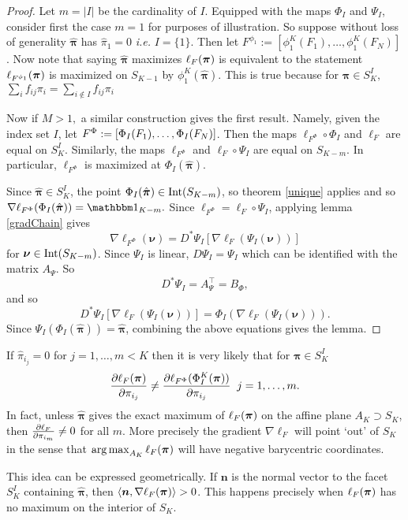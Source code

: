 \begin{proof}
	Let \( m = |I| \) be the cardinality of \( I \).
	Equipped with the maps \( \Phi_I \) and \( \Psi_I \), consider first the case \( m = 1 \)  for purposes of illustration. So suppose without loss of generality \( \hat{\bm \pi} \) has \( \hat{\pi}_1 = 0\) \textit{i.e.} \( I = \{1\} \).  Then let \( F^{\phi_1} := [\phi_1^{K}(F_1),\ldots,\phi_1^{K}(F_N)] \). Now note that saying \( \hat{\bm\pi} \) maximizes \( \elpi F \) is equivalent to the statement \(\elpi{F^{\phi_1}}\) is maximized on \( S_{K-1} \) by \( \phi_1^{K}(\hat{\bm \pi}) \). This is true because for \( \bm\pi\in S_K^I, \) \( \sum_i f_{ij}\pi_i = \sum_{i\notin I} f_{ij}\pi_i\)
		
	Now if \(M>1,\) a similar construction gives the first result. Namely, given the index set \( I \), let \( F^{\Phi} \defined [\Phi_I(F_1),\ldots,\Phi_I(F_N)] \). Then the maps \( \ell_{F^{\Phi}}\circ \Phi_I \) and \(\ell_{F}\) are equal on \( S_K^I \). Similarly, the maps \(\ell_{F^{\Phi}}\) and \(\ell_{F}\circ\Psi_I\) are equal on \( S_{K-m} \).  In particular, \(\ell_{F^{\Phi}}\) is maximized at \(\Phi_I(\hat{\bm \pi})\).
	
	Since \( \hat{\bm \pi}\in S_K^I \), the point \( \Phi_I(\hat{\bm \pi})\in\op{Int}(S_{K-m}) \), so theorem \ref{unique} applies and so \( \nabla \ell_{F^{\Phi}}(\Phi_I(\hat{\bm \pi})) = \mathbbm 1_{K-m}. \)  Since \(\ell_{F^{\Phi}} = \ell_{F}\circ\Psi_I\), applying lemma \ref{gradChain} gives
	\[ \nabla \ell_{F^{\Phi}}(\bm\nu)  = D^{\ast}\Psi_I[\nabla \ell_F(\Psi_I(\bm\nu))]\]
	for \( \bm\nu\in \op{Int}(S_{K-m})\).  Since \( \Psi_I \) is linear, \( D\Psi_I= \Psi_I \) which can be identified with the matrix \( A_{\Psi} \). So 
	\[ D^{\ast}\Psi_I = A_{\Psi}^{\intercal} = B_{\Phi}, \] 
	and so
	\[ D^{\ast}\Psi_I[\nabla \ell_F(\Psi_I(\bm\nu))] = \Phi_I(\nabla \ell_F(\Psi_I(\bm\nu))). \]
	Since \( \Psi_I(\Phi_I(\hat{\bm \pi})) =  \hat{\bm \pi}\), combining the above equations gives the lemma.
\end{proof}

\begin{rk}\label{rk:boundaryGradient}
	If \( \hat{\pi}_{i_j} =0 \) for \( j=1,\ldots,m<K \) then it is very likely that for \( \bm\pi\in S_K^I \)
	\[\pdv{\elpi{F}}{\pi_{i_j}} \neq \pdv{\elpi[\Phi_I^{K}(\bm\pi)]{F^{\Phi}}}{\pi_{i_j}}\;\;j=1,\ldots,m.\] 
	In fact, unless \( \hat{\bm\pi} \) gives the exact maximum of \( \elpi F \) on the affine plane \(A_K \supset S_K \), then \( \pdv{\ell_F}{\pi_{i_m}} \neq  0\) for all \( m \). More precisely the gradient \( \nabla \ell_F \) will point `out' of \( S_K \)  in the sense that \( \argmax_{A_K} \elpi{F} \) will have negative barycentric coordinates. 
	
	This idea can be expressed geometrically.  If \( \bm n \) is the normal vector to the facet \( S_K^I \) containing \( \hat{\bm \pi} \), then \( \langle\bm n,\nabla\elpi{F}\rangle >0 \). This happens precisely when \(\elpi{F} \) has no maximum on the interior of \( S_K \). 
\end{rk}

